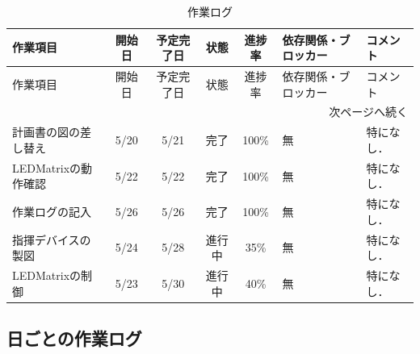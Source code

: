 \documentclass[uplatex,dvipdfmx,a4paper,11pt]{jsarticle}
\begin{document}
\begin{longtable}{|p{3cm}|c|c|c|c|p{3.5cm}|p{4cm}|}
\caption{作業ログ} \\
\hline
作業項目 & 開始日 & 予定完了日 & 状態 & 進捗率 & 依存関係・ブロッカー & コメント \\
\hline
\endfirsthead

\hline
作業項目 & 開始日 & 予定完了日 & 状態 & 進捗率 & 依存関係・ブロッカー & コメント \\
\hline
\endhead

\hline
\multicolumn{7}{r}{次ページへ続く} \\
\hline
\endfoot

\hline
\endlastfoot

計画書の図の差し替え &
5/20 &
5/21 &
完了 &
100\% &
無 &
特になし． \\
\hline

LEDMatrixの動作確認 &
5/22 &
5/22 &
完了 &
100\% &
無 &
特になし． \\
\hline

作業ログの記入 &
5/26 &
5/26 &
完了 &
100\% &
無 &
特になし． \\
\hline

指揮デバイスの製図 &
5/24 &
5/28 &
進行中 &
35\% &
無 &
特になし． \\
\hline

LEDMatrixの制御 &
5/23 &
5/30 &
進行中 &
40\% &
無 &
特になし． \\
\hline



\end{longtable}


\subsection{日ごとの作業ログ}
 

    \renewcommand{\arraystretch}{1.2}

    \small
    
\end{document}
